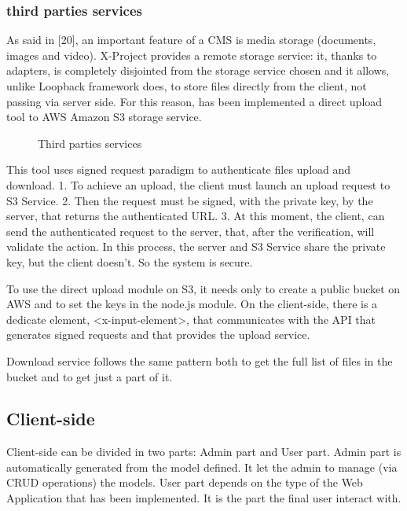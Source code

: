 \documentclass{sig-alternate}
\begin{document}
\subsubsection{third parties services}
As said in [20], an important feature of a CMS is media storage (documents, images and video). X-Project provides a remote storage service: it, thanks to adapters, is completely disjointed from the storage service chosen and it allows, unlike Loopback framework does, to store files directly from the client, not passing via server side.
For this reason, has been implemented a direct upload tool to AWS Amazon S3 storage service.




\begin{figure}[!htbp]
\centering
{}
\caption{Third parties services}
\label{fig:services}
\end{figure}




This tool uses signed request paradigm to authenticate files upload and download.
1. To achieve an upload, the client must launch an upload request to S3 Service. 
2. Then the request must be signed, with the private key, by the server, that returns the authenticated URL. 
3. At this moment, the client, can send the authenticated request to the server, that, after the verification, will validate the action.
In this process, the server and S3 Service share the private key, but the client doesn’t. So the system is secure.




To use the direct upload module on S3, it needs only to create a public bucket on AWS and to set the keys in the node.js module.
On the client-side, there is a dedicate element, <x-input-element>, that communicates with the API that generates signed requests and that provides the upload service.




Download service follows the same pattern both to get the full list of files in the bucket and to get just a part of it. 







\subsection{Client-side}


Client-side can be divided in two parts: Admin part and User part.
Admin part is automatically generated from the model defined. It let the admin to manage (via CRUD operations) the models.
User part depends on the type of the Web Application that has been implemented.
It is the part the final user interact with.
\end{document}
